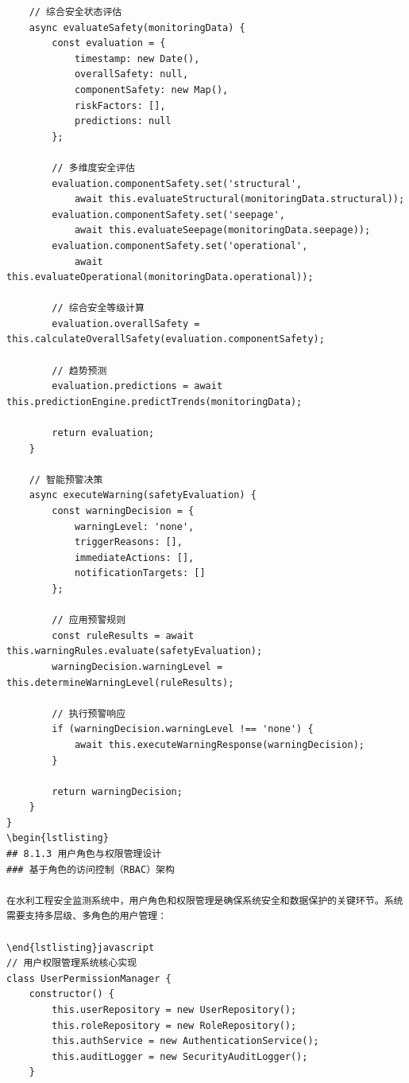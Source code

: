 \begin{verbatim}
    // 综合安全状态评估
    async evaluateSafety(monitoringData) {
        const evaluation = {
            timestamp: new Date(),
            overallSafety: null,
            componentSafety: new Map(),
            riskFactors: [],
            predictions: null
        };
        
        // 多维度安全评估
        evaluation.componentSafety.set('structural', 
            await this.evaluateStructural(monitoringData.structural));
        evaluation.componentSafety.set('seepage', 
            await this.evaluateSeepage(monitoringData.seepage));
        evaluation.componentSafety.set('operational', 
            await this.evaluateOperational(monitoringData.operational));
        
        // 综合安全等级计算
        evaluation.overallSafety = this.calculateOverallSafety(evaluation.componentSafety);
        
        // 趋势预测
        evaluation.predictions = await this.predictionEngine.predictTrends(monitoringData);
        
        return evaluation;
    }
    
    // 智能预警决策
    async executeWarning(safetyEvaluation) {
        const warningDecision = {
            warningLevel: 'none',
            triggerReasons: [],
            immediateActions: [],
            notificationTargets: []
        };
        
        // 应用预警规则
        const ruleResults = await this.warningRules.evaluate(safetyEvaluation);
        warningDecision.warningLevel = this.determineWarningLevel(ruleResults);
        
        // 执行预警响应
        if (warningDecision.warningLevel !== 'none') {
            await this.executeWarningResponse(warningDecision);
        }
        
        return warningDecision;
    }
}
\begin{lstlisting}
## 8.1.3 用户角色与权限管理设计
### 基于角色的访问控制（RBAC）架构

在水利工程安全监测系统中，用户角色和权限管理是确保系统安全和数据保护的关键环节。系统需要支持多层级、多角色的用户管理：

\end{lstlisting}javascript
// 用户权限管理系统核心实现
class UserPermissionManager {
    constructor() {
        this.userRepository = new UserRepository();
        this.roleRepository = new RoleRepository();
        this.authService = new AuthenticationService();
        this.auditLogger = new SecurityAuditLogger();
    }
    

\end{verbatim}
